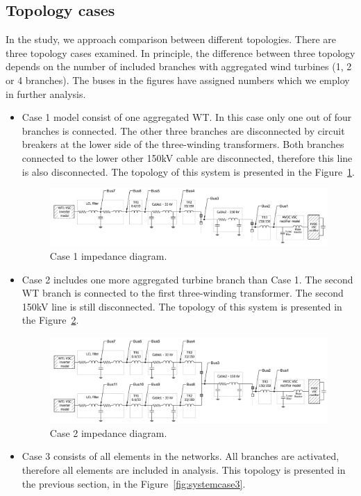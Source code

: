 \documentclass[12pt]{report} %
\begin{document}
\subsection{Topology cases} \label{sec:topologycases}
In the study, we approach comparison between different topologies. There are three topology cases examined. In principle, the difference between three topology depends on the number of included branches with aggregated wind turbines (1, 2 or 4 branches). The buses in the figures have assigned numbers which we employ in further analysis.
\begin{itemize}
	\item Case 1 model consist of one aggregated WT. In this case only one out of four branches is connected. The other three branches are disconnected by circuit breakers at the lower side of the three-winding transformers. Both branches connected to the lower other 150kV cable are disconnected, therefore this line is also disconnected. The topology of this system is presented in the Figure~\ref{fig:systemcase1}. 
	
\begin{figure}[htb]
	\centering
	\includegraphics[width=1\textwidth]{img/Case1/system_case1.png}
  	\caption{Case 1 impedance diagram.}
  	\label{fig:systemcase1}
\end{figure}
\FloatBarrier

\item Case 2 includes one more aggregated turbine branch than Case 1. The second WT branch is connected to the first three-winding transformer. The second 150kV line is still disconnected. The topology of this system is presented in the Figure~\ref{fig:systemcase2}.

\begin{figure}[htb]
	\centering
	\includegraphics[width=1\textwidth]{img/Case2/system_case2.png}
  	\caption{Case 2 impedance diagram.}
  	\label{fig:systemcase2}
\end{figure}
\FloatBarrier

\item Case 3 consists of all elements in the networks. All branches are activated, therefore all elements are included in analysis. This topology is presented in the previous section, in the Figure~\ref{fig:systemcase3}.
\end{itemize}
\end{document}

